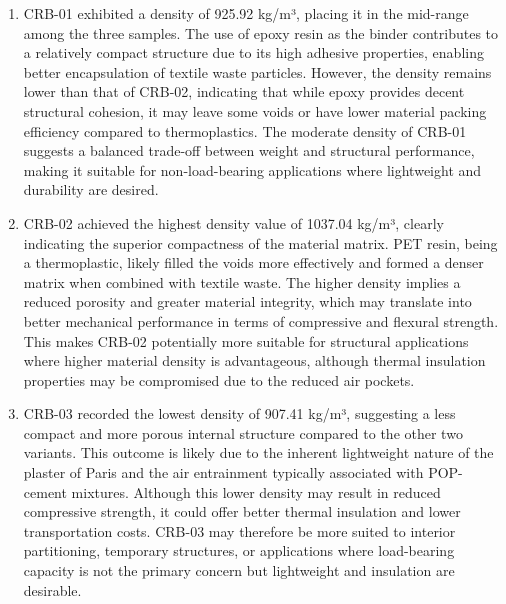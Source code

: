 \begin{enumerate}
	\item CRB-01 exhibited a density of 925.92 kg/m³, placing it in the mid-range among the three samples. The use of epoxy resin as the binder contributes to a relatively compact structure due to its high adhesive properties, enabling better encapsulation of textile waste particles. However, the density remains lower than that of CRB-02, indicating that while epoxy provides decent structural cohesion, it may leave some voids or have lower material packing efficiency compared to thermoplastics. The moderate density of CRB-01 suggests a balanced trade-off between weight and structural performance, making it suitable for non-load-bearing applications where lightweight and durability are desired.
	\item CRB-02 achieved the highest density value of 1037.04 kg/m³, clearly indicating the superior compactness of the material matrix. PET resin, being a thermoplastic, likely filled the voids more effectively and formed a denser matrix when combined with textile waste. The higher density implies a reduced porosity and greater material integrity, which may translate into better mechanical performance in terms of compressive and flexural strength. This makes CRB-02 potentially more suitable for structural applications where higher material density is advantageous, although thermal insulation properties may be compromised due to the reduced air pockets.
	\item CRB-03 recorded the lowest density of 907.41 kg/m³, suggesting a less compact and more porous internal structure compared to the other two variants. This outcome is likely due to the inherent lightweight nature of the plaster of Paris and the air entrainment typically associated with POP-cement mixtures. Although this lower density may result in reduced compressive strength, it could offer better thermal insulation and lower transportation costs. CRB-03 may therefore be more suited to interior partitioning, temporary structures, or applications where load-bearing capacity is not the primary concern but lightweight and insulation are desirable.
\end{enumerate}

